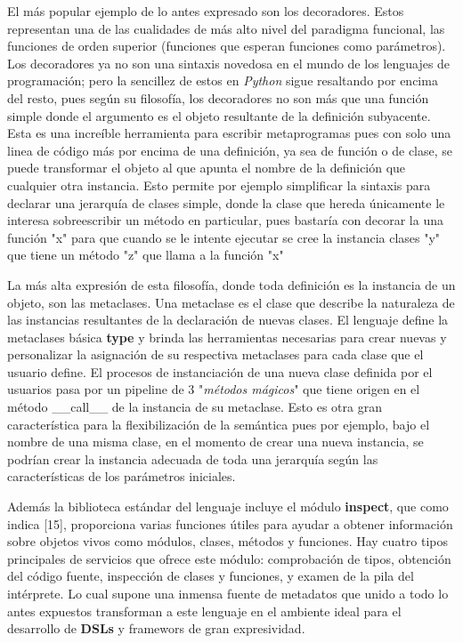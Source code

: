 El más popular ejemplo de lo antes expresado son los decoradores. Estos representan una de las
cualidades de más alto nivel del paradigma funcional, las funciones de orden superior (funciones
que esperan funciones como parámetros). Los decoradores ya no son una sintaxis novedosa en el
mundo de los lenguajes de programación; pero la sencillez de estos en {\it Python} sigue resaltando
por encima del resto, pues según su filosofía, los decoradores no son más que una función
simple donde el argumento es el objeto resultante de la definición subyacente. Esta es una
increíble herramienta para escribir metaprogramas pues con solo una linea de código más por
encima de una definición, ya sea de función o de clase, se puede transformar el objeto al que
apunta el nombre de la definición que cualquier otra instancia. Esto permite por ejemplo
simplificar la sintaxis para declarar una jerarquía de clases simple, donde la clase que hereda
únicamente le interesa sobreescribir un método en particular, pues bastaría con decorar la
una función "x" para que cuando se le intente ejecutar se cree la instancia clases "y"
que tiene un método "z" que llama a la función "x"

La más alta expresión de esta filosofía, donde toda definición es la instancia de un objeto,
son las metaclases. Una metaclase es el clase que describe la naturaleza de las instancias
resultantes de la declaración de nuevas clases. El lenguaje define la metaclases básica
{\bf type} y brinda las herramientas necesarias para crear nuevas y personalizar la asignación
de su respectiva metaclases para cada clase que el usuario define. El procesos de instanciación
de una nueva clase definida por el usuarios pasa por un pipeline de 3 "{\it métodos mágicos}" que
tiene origen en el método \_\_call\_\_ de la instancia de su metaclase. Esto es otra gran
característica para la flexibilización de la semántica pues por ejemplo, bajo el nombre de una
misma clase, en el momento de crear una nueva instancia, se podrían crear la instancia adecuada
de toda una jerarquía según las características de los parámetros iniciales.

Además la biblioteca estándar del lenguaje incluye el módulo {\bf inspect}, que como indica [15],
proporciona varias funciones útiles para ayudar a obtener información sobre objetos vivos
como módulos, clases, métodos y funciones. Hay cuatro tipos principales de servicios que ofrece
este módulo: comprobación de tipos, obtención del código fuente, inspección de clases y funciones,
y examen de la pila del intérprete. Lo cual supone una inmensa fuente de metadatos que unido
a todo lo antes expuestos transforman a este lenguaje en el ambiente ideal para el desarrollo de
    {\bf DSLs} y framewors de gran expresividad.

